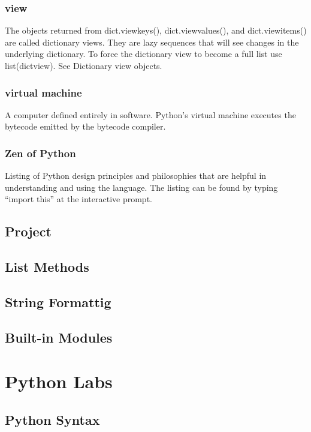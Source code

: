 \documentclass[12pt,a4paper,final,twoside,onecolumn,titlepage]{book}
\begin{document}
\section{view}
The objects returned from dict.viewkeys(), dict.viewvalues(), and dict.viewitems() are called dictionary views. They are lazy sequences that will see changes in the underlying dictionary. To force the dictionary view to become a full list use list(dictview). See Dictionary view objects.
\section{virtual machine}
A computer defined entirely in software. Python’s virtual machine executes the bytecode emitted by the bytecode compiler.
\section{Zen of Python}
Listing of Python design principles and philosophies that are helpful in understanding and using the language. The listing can be found by typing “import this” at the interactive prompt.

\chapter{Project}


\chapter{List Methods}


\chapter{String Formattig}


\chapter{Built-in Modules}


\part{Python Labs}

\chapter{Python Syntax}
\end{document}
